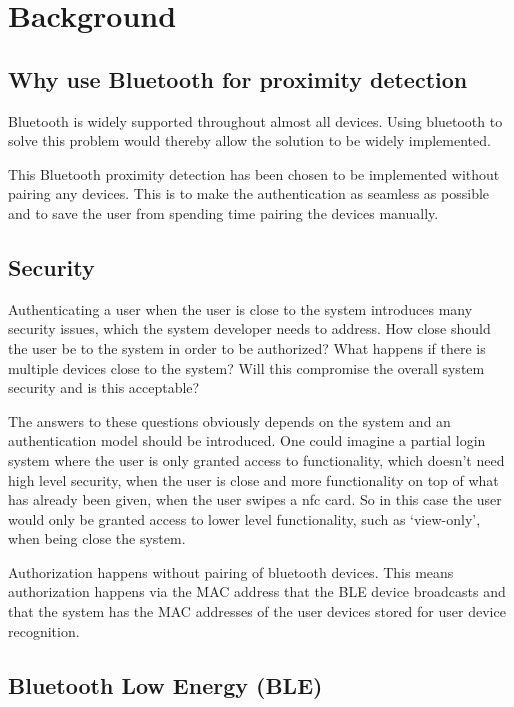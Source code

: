 \section{Background}

\subsection{Why use Bluetooth for proximity detection}

Bluetooth is widely supported throughout almost all devices.
Using bluetooth to solve this problem would thereby allow the solution to be widely implemented.

This Bluetooth proximity detection has been chosen to be implemented without pairing any devices. This is to make the authentication as seamless as possible and to save the user from spending time pairing the devices manually.

\subsection{Security}

Authenticating a user when the user is close to the system introduces many security issues, which the system developer needs to address.
How close should the user be to the system in order to be authorized? What happens if there is multiple devices close to the system? Will this compromise the overall system security and is this acceptable?

The answers to these questions obviously depends on the system and an authentication model should be introduced.
One could imagine a partial login system where the user is only granted access to functionality, which doesn’t need high level security, when the user is close and more functionality on top of what has already been given, when the user swipes a nfc card.
So in this case the user would only be granted access to lower level functionality, such as ‘view-only’, when being close the system.

Authorization happens without pairing of bluetooth devices.
This means authorization happens via the MAC address that the BLE device broadcasts and that the system has the MAC addresses of the user devices stored for user device recognition.

\subsection{Bluetooth Low Energy (BLE)}

